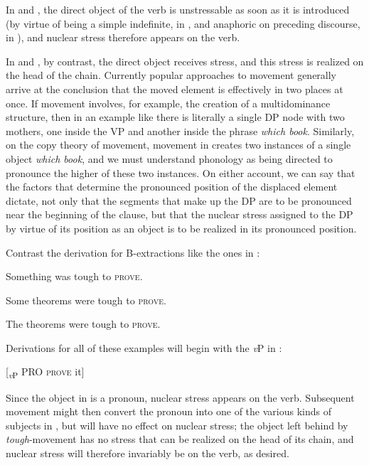 \documentclass[output=paper]{LSP/langsci}
\begin{document}
In  and , the direct object of the verb is unstressable as soon as it is introduced (by virtue of being a simple indefinite, in , and anaphoric on preceding discourse, in ), and nuclear stress therefore appears on the verb.  

  In  and , by contrast, the direct object receives stress, and this stress is realized on the head of the chain.  Currently popular approaches to movement generally arrive at the conclusion that the moved element is effectively in two places at once.  If movement involves, for example, the creation of a multidominance structure, then in an example like  there is literally a single DP node with two mothers, one inside the VP and another inside the phrase \textit{which book}.  Similarly, on the copy theory of movement, movement in  creates two instances of a single object \textit{which book}, and we must understand phonology as being directed to pronounce the higher of these two instances.  On either account, we can say that the factors that determine the pronounced position of the displaced element dictate, not only that the segments that make up the DP are to be pronounced near the beginning of the clause, but that the nuclear stress assigned to the DP by virtue of its position as an object is to be realized in its pronounced position.  

  Contrast the derivation for B-extractions like the ones in :


\ea%
    \label{ex:richards:44}
  
\ea Something was tough to \textsc{prove}.

\ex Some theorems were tough to \textsc{prove}.

\ex The theorems were tough to \textsc{prove}.
\z
\z

Derivations for all of these examples will begin with the \textit{v}P in :


\ea%
    \label{ex:richards:45}
  	  [\textit{\textsubscript{v}}\textsubscript{P} PRO \textsc{prove} it]
\z

Since the object in  is a pronoun, nuclear stress appears on the verb.  Subsequent movement might then convert the pronoun into one of the various kinds of subjects in , but will have no effect on nuclear stress; the object left behind by \textit{tough}{}-movement has no stress that can be realized on the head of its chain, and nuclear stress will therefore invariably be on the verb, as desired.
\end{document}
